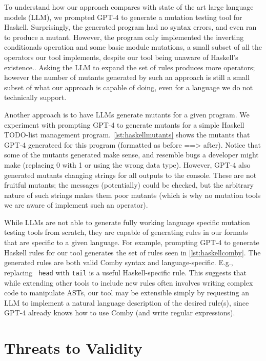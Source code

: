 \documentclass[acmsmall,screen,review,anonymous]{acmart}
\begin{document}
{To understand how our approach compares with state of the art large language models (LLM), we prompted GPT-4 to generate a mutation testing tool for Haskell.
Surprisingly, the generated program had no syntax errors, and even ran to produce a mutant. However, the program only implemented
the inverting conditionals operation and some basic module mutations,
a small subset of all the operators our tool implements, despite our
tool being unaware of Haskell's existence.. Asking the LLM to expand the set of rules
 produces more operators; however the number of mutants generated by
 such an approach is still a small subset of what our approach is
 capable of doing, even for a language we do not technically support.

 Another approach is to have LLMs generate mutants for a given program. We experiment with prompting GPT-4 to generate mutants for a simple Haskell TODO-list management program.
 \cref{lst:haskellmutants} shows the mutants that GPT-4 generateed for this program (formatted as before ==> after). Notice that some of the mutants generated make sense, and 
 resemble bugs a developer might make (replacing 0 with 1 or using the
 wrong data type). However, GPT-4 also generated mutants changing
strings for all outputs to the console. These are not fruitful
mutants; the messages (potentially) could be checked,
 but the arbitrary nature of such strings makes them
 poor mutants (which is why no mutation tools we are aware of
 implement such an operator).

While LLMs are not able to generate fully working language specific
mutation testing tools from scratch, they are capable of generating
rules in our formats
 that are specific to a given language. For example, prompting GPT-4
 to generate Haskell rules for our tool generates the set of rules seen in \cref{lst:haskellcomby}. The generated rules are 
 both valid Comby syntax and language-specific. E.g., replacing {\tt
   head} with {\tt tail} is a useful Haskell-specific rule.  This suggests that while extending other tools to include new rules
 often involves writing complex code to manipulate ASTs, our tool may
 be extensible simply by requesting an LLM to implement a natural
 language description of the desired rule(s), since GPT-4 already knows
 how to use Comby (and write regular expressions).

\section{Threats to Validity}

}
\end{document}
